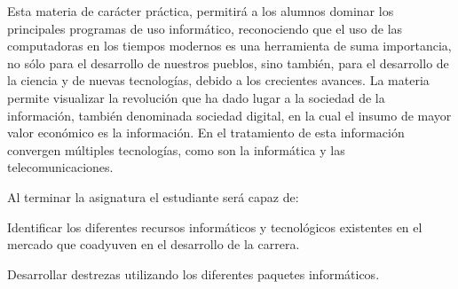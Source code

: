 \begin{syllabus}


\begin{justification}
Esta materia de carácter práctica, permitirá a los alumnos dominar los principales programas de uso informático, reconociendo que el uso de las computadoras en los tiempos modernos es una herramienta de suma importancia, no sólo para el desarrollo de nuestros pueblos, sino también, para el desarrollo de la ciencia y de nuevas tecnologías, debido a los crecientes avances. La materia permite visualizar la revolución que ha dado lugar a la sociedad de la información, también denominada sociedad digital, en la cual el insumo de mayor valor económico es la información. En el tratamiento de esta información convergen múltiples tecnologías, como son la informática y las telecomunicaciones. 
\end{justification}

\begin{goals}
Al terminar la asignatura el estudiante será capaz de:

\item Identificar los diferentes recursos informáticos y tecnológicos existentes en el mercado que coadyuven en el desarrollo de la carrera.
\item Desarrollar destrezas utilizando los diferentes paquetes informáticos.
\end{goals}

\begin{outcomes}
\end{outcomes}


\end{syllabus}
